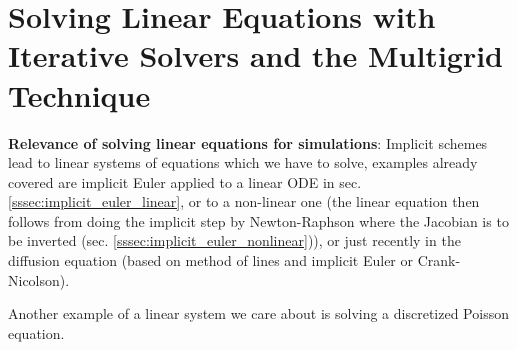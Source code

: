 \section{Solving Linear Equations with Iterative Solvers and the Multigrid Technique}
\thispagestyle{plain}

\textbf{Relevance of solving linear equations for simulations}: Implicit schemes lead to linear systems of equations which we have to solve,
examples already covered are implicit Euler applied to a linear ODE in sec. \ref{sssec:implicit_euler_linear},
or to a non-linear one (the linear equation then follows from doing the implicit step
by Newton-Raphson where the Jacobian is to be inverted (sec. \ref{sssec:implicit_euler_nonlinear})),
or just recently in the diffusion equation (based on method of lines and implicit Euler or Crank-Nicolson).

Another example of a linear system we care about is solving a discretized Poisson equation.



